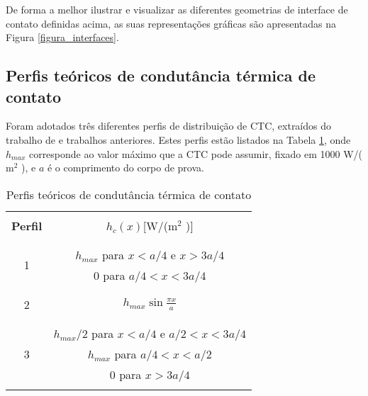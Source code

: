 De forma a melhor ilustrar e visualizar as diferentes geometrias de interface de contato definidas acima, as suas representações gráficas são apresentadas na Figura \ref{figura_interfaces}.



\subsection{Perfis teóricos de condutância térmica de contato}\label{config_ctc}

Foram adotados três diferentes perfis de distribuição de CTC, extraídos do trabalho de \cite{tese_padilha} e trabalhos anteriores. Estes perfis estão listados na Tabela \ref{tabela_ctc}, onde $h_{max}$ corresponde ao valor máximo que a CTC pode assumir, fixado em 1000 W/($\text{m}^2$ \celsius), e $a$ é o comprimento do corpo de prova.
\begin{table}[H]
	\begin{center}
		\begin{tabular}{c|c}
			\hline \\
			\textbf{Perfil} & $h_c(x)$[W/($\text{m}^2$ \celsius)]  \\ \\ \hline \\
			\multirow{2}{*}{1} & $h_{max}$ para $x < a/4$ e $x > 3a/4$ \\ & 0 para $a/4 < x < 3a/4$ \\ \\ \hline \\
			2 & $h_{max}\sin\displaystyle\frac{\pi x}{a}$ \\ \\ \hline \\
			\multirow{3}{*}{3} & $h_{max}/2$ para $x < a/4$ e $a/2 < x < 3a/4$ \\ & $h_{max}$ para $a/4 < x < a/2$ \\ & 0 para $ x > 3a/4$
			\\ \\ \hline
		\end{tabular}		
	\end{center}
	\caption{Perfis teóricos de condutância térmica de contato}
	\label{tabela_ctc}
\end{table}

